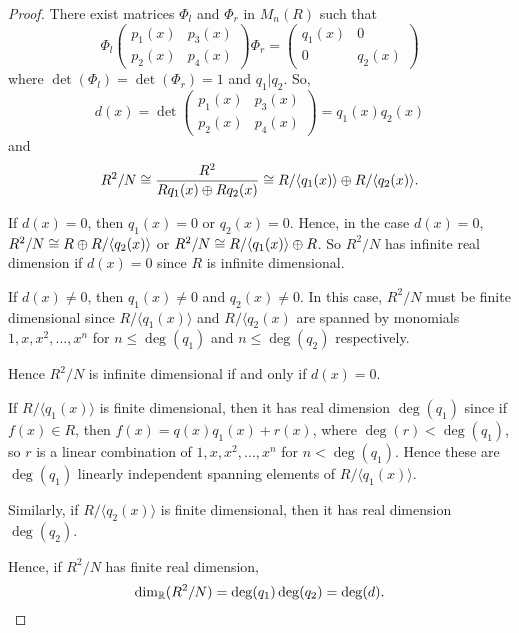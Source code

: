 \documentclass{unswmaths}
\begin{document}
\begin{proof}
    There exist matrices $\Phi_l$ and $\Phi_r$ in $M_n(R)$ such that
    \begin{equation*}
        \Phi_l\begin{pmatrix}
            p_1(x) & p_3(x)\\
            p_2(x) & p_4(x)
        \end{pmatrix}\Phi_r = \begin{pmatrix}
            q_1(x) & 0\\
            0 & q_2(x)
        \end{pmatrix}
    \end{equation*}
    where $\det(\Phi_l) = \det(\Phi_r) = 1$ and $q_1|q_2$. So,
    \begin{equation*}
        d(x) = \det\begin{pmatrix}
            p_1(x) & p_3(x)\\
            p_2(x) & p_4(x)
        \end{pmatrix} = q_1(x)q_2(x)
    \end{equation*}
    and
    \begin{equation*}
        R^2/N \cong \frac{R^2}{Rq_1(x)\oplus Rq_2(x)} \cong R/\langle q_1(x)\rangle \oplus R/\langle q_2(x)\rangle.
    \end{equation*}
    
    If $d(x) = 0$, then $q_1(x) = 0$ or $q_2(x) = 0$. Hence, in the case
    $d(x) = 0$, $R^2/N \cong R\oplus R/\langle q_2(x)\rangle$ or $R^2/N \cong R/\langle q_1(x)\rangle \oplus R$.
    So $R^2/N$ has infinite real dimension if $d(x) = 0$ since $R$ is infinite dimensional.
    
    If $d(x) \neq 0$, then $q_1(x) \neq 0$ and $q_2(x) \neq 0$. In this case, 
    $R^2/N$ must be finite dimensional since $R/\langle q_1(x)\rangle$ and $R/\langle q_2(x)$
    are spanned by monomials $1,x,x^2,\ldots,x^n$ for $n\leq \deg(q_1)$ and $n\leq \deg(q_2)$ respectively.
    
    Hence $R^2/N$ is infinite dimensional if and only if $d(x) = 0$.     
    
    If $R/\langle q_1(x)\rangle$ is finite dimensional, then it has real dimension $\deg(q_1)$
    since if $f(x) \in R$, then $f(x) = q(x)q_1(x) + r(x)$, where $\deg(r) < \deg(q_1)$, so 
    $r$ is a linear combination of $1,x,x^2,\ldots,x^n$ for $n < \deg(q_1)$. Hence these
    are $\deg(q_1)$ linearly independent spanning elements of $R/\langle q_1(x)\rangle$. 
    
    Similarly, if $R/\langle q_2(x)\rangle$ is finite dimensional, then it has real
    dimension $\deg(q_2)$.
    
    Hence, if $R^2/N$ has finite real dimension, 
    \begin{equation*}
        \dim_{\mathbb{R}}(R^2/N) = \deg(q_1)\deg(q_2) = \deg(d).
    \end{equation*}
\end{proof}
\end{document}

